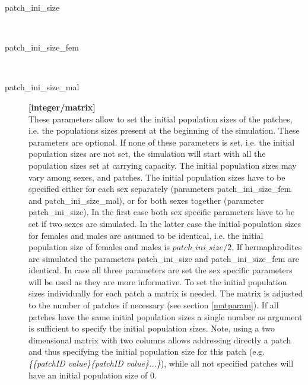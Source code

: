 \documentclass[letterpaper,12pt,oneside]{book}
\begin{document}
\begin{description}

\item[patch\_ini\_size]\hspace*{\fill}\\
\vspace{-9mm}
\item[patch\_ini\_size\_fem]\hspace*{\fill}\\
\vspace{-9mm}
\item[patch\_ini\_size\_mal]\textbf{[integer/matrix]}\\
These parameters allow to set the initial population sizes of the patches, i.e. the populations sizes present at the beginning of the simulation. These parameters are optional. If none of these parameters is set, i.e. the initial population sizes are not set, the simulation will start with all the population sizes set at carrying capacity. The initial population sizes may vary among sexes, and patches. The initial population sizes have to be specified either for each sex separately (parameters \textsf{patch\_ini\_size\_fem} and \textsf{patch\_ini\_size\_mal}), or for both sexes together (parameter \textsf{patch\_ini\_size}). In the first case both sex specific parameters have to be set if two sexes are simulated. In the latter case the initial population sizes for females and males are assumed to be identical, i.e. the initial population size of females and males is $patch\_ini\_size/2$. If hermaphrodites are simulated the parameters \textsf{patch\_ini\_size} and \textsf{patch\_ini\_size\_fem} are identical. In case all three parameters are set the sex specific parameters will be used as they are more informative. To set the initial population sizes individually for each patch a matrix is needed. The matrix is adjusted to the number of patches if necessary (see section \ref{matparam}). If all patches have the same initial population sizes a single number as argument is sufficient to specify the initial population sizes. Note, using a two dimensional matrix with two columns allows addressing directly a patch and thus specifying the initial population size for this patch (e.g. \textit{\{\{patchID value\}\{patchID value\}...\}}), while all not specified patches will have an initial population size of 0.
\end{description}
\end{document}
